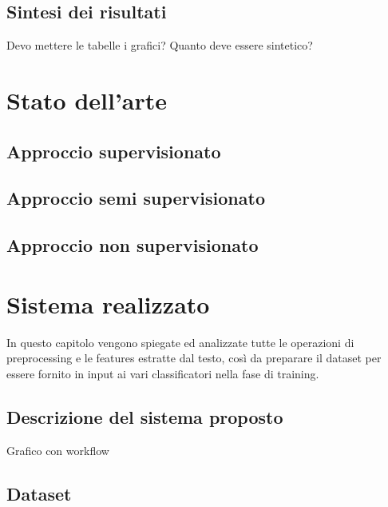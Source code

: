 \documentclass[oneside]{book}
\begin{document}
\section*{Sintesi dei risultati}
Devo mettere le tabelle i grafici? Quanto deve essere sintetico?


\chapter{Stato dell'arte}

\section{Approccio supervisionato}

\section{Approccio semi supervisionato}

\section{Approccio non supervisionato}




\chapter{Sistema realizzato}
In questo capitolo vengono spiegate ed analizzate tutte le operazioni di preprocessing e le features estratte dal testo, così da preparare il dataset per essere fornito in input ai vari classificatori nella fase di training.


\section{Descrizione del sistema proposto}

Grafico con workflow

\section{Dataset}
\end{document}
